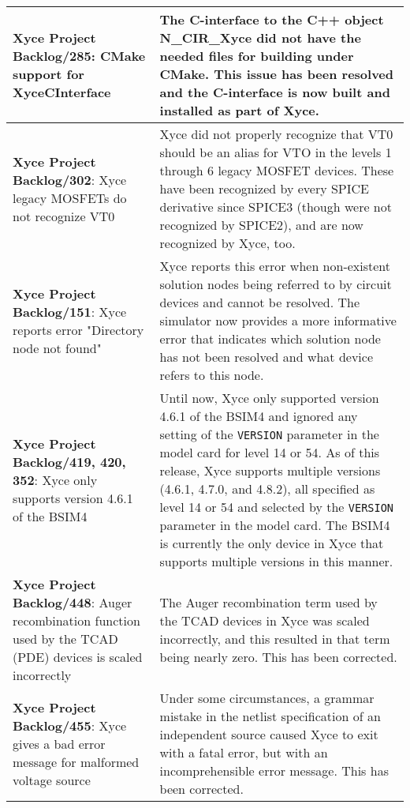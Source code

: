 {\begin{longtable}[h] {>{\raggedright\small}m{2in}|>{\raggedright\let\\\tabularnewline\small}m{3.5in}}
\textbf{Xyce Project Backlog/285}: CMake support for XyceCInterface &
The C-interface to the C++ object N\_CIR\_Xyce did not have the needed
files for building under CMake.  This issue has been resolved and the 
C-interface is now built and installed as part of Xyce. \\ \hline

\textbf{Xyce Project Backlog/302}: Xyce legacy MOSFETs do not recognize VT0 &
Xyce did not properly recognize that VT0 should be an alias for VTO in
the levels 1 through 6 legacy MOSFET devices.  These have been
recognized by every SPICE derivative since SPICE3 (though were not
recognized by SPICE2), and are now recognized by Xyce, too. \\ \hline

\textbf{Xyce Project Backlog/151}: Xyce reports error "Directory node not found" &
Xyce reports this error when non-existent solution nodes being referred to
by circuit devices and cannot be resolved.  The simulator now provides a more
informative error that indicates which solution node has not been resolved and
what device refers to this node. \\ \hline

\textbf{Xyce Project Backlog/419, 420, 352}:  Xyce only supports version 4.6.1 of the BSIM4 &
Until now, Xyce only supported version 4.6.1 of the BSIM4 and ignored
any setting of the \texttt{VERSION} parameter in the model card for level
14 or 54.  As of this release, Xyce supports multiple versions (4.6.1,
4.7.0, and 4.8.2), all specified as level 14 or 54 and selected by
the \texttt{VERSION} parameter in the model card.  The BSIM4 is
currently the only device in Xyce that supports multiple versions in
this manner. \\ \hline


\textbf{Xyce Project Backlog/448}:  Auger recombination function used by 
the TCAD (PDE) devices is scaled incorrectly & The Auger recombination term 
used by the TCAD devices in Xyce was scaled incorrectly, and this resulted 
in that term being nearly zero.  This has been corrected.
\\ \hline

\textbf{Xyce Project Backlog/455}:  Xyce gives a bad error message for 
malformed voltage source & Under some circumstances, a grammar mistake 
in the netlist specification of an independent source caused Xyce to 
exit with a fatal error, but with an incomprehensible error message.  
This has been corrected.
\\ \hline

\end{longtable}
}
